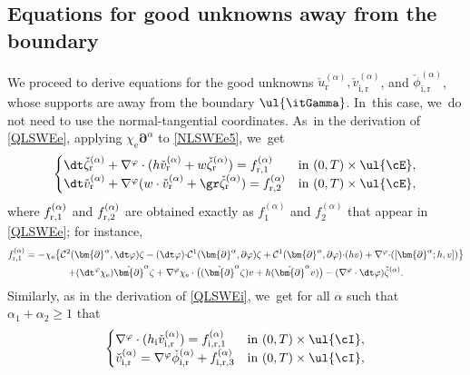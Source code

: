 \subsection{Equations for good unknowns away from the boundary}\label{subsect:EqGUb}
We proceed to derive equations for the good unknowns $\check{u}_\mathrm{r}^{(\alpha)},\check{v}_\mathrm{i,r}^{(\alpha)}$, and $\check{\phi}_\mathrm{i,r}^{(\alpha)}$,
whose supports are away from the boundary $\ul{\itGamma}$. In~this case, we~do not need to use the normal-tangential coordinates. As~in the derivation of \eqref{QLSWEe}, applying $\chi_\mathrm{e}\bm{\partial}^\alpha$ to \eqref{NLSWEe5}, we~get
\begin{equation}\label{QLSWEr}
\begin{cases}
\dt\check{\zeta}_\mathrm{r}^{(\alpha)}+\nabla^\varphi\cdot(h\check{v}_\mathrm{r}^{(\alpha)}+w\check{\zeta}_\mathrm{r}^{(\alpha)}) = f_{{\rm r},1}^{(\alpha)}
&\text{in } (0,T)\times\ul{\cE}, \\
\dt\check{v}_\mathrm{r}^{(\alpha)}+\nabla^\varphi(w\cdot\check{v}_\mathrm{r}^{(\alpha)}+\gr\check{\zeta}_\mathrm{r}^{(\alpha)}) = f_{{\rm r},2}^{(\alpha)}
&\text{in } (0,T)\times\ul{\cE},
\end{cases}
\end{equation}
where $f_{{\rm r},1}^{(\alpha)}$ and $f_{{\rm r},2}^{(\alpha)}$ are obtained exactly as $f_{1}^{(\alpha)}$ and $f_{2}^{(\alpha)}$ that appear in \eqref{QLSWEe};
for instance,
\begin{multline*}
f_{{\rm r},1}^{(\alpha)}
= -\chi_\mathrm{e} \big\{ {\mathcal C}^2(\bm{\partial}^\alpha,\dt\varphi)\zeta
- (\dt\varphi){\cdot} {\mathcal C}^1(\bm{\partial}^\alpha,\partial\varphi)\zeta
+{\mathcal C}^1(\bm{\partial}^\alpha,\partial\varphi){\cdot} (hv)+ \nabla^\varphi{\cdot}([\bm{\partial}^\alpha;h,v]) \big\} \\
+ (\dt^\varphi\chi_\mathrm{e}) \check{\bm{\partial}}^\alpha\zeta
+ \nabla^\varphi\chi_\mathrm{e}\cdot\bigl((\check{\bm{\partial}}^\alpha \zeta)v + h (\check{\bm{\partial}}^\alpha v) \bigr)
- (\nabla^\varphi\cdot\dt\varphi)\check{\zeta}^{(\alpha)}.
\end{multline*}
Similarly, as in the derivation of \eqref{QLSWEi}, we~get for all $\alpha$ such that $\alpha_1+\alpha_2\geq 1$ that
\begin{equation}\label{QLSWEir}
\begin{cases}
\nabla^\varphi\cdot(h_\mathrm{i}\check{v}_\mathrm{i,r}^{(\alpha)}) = f_{{\rm i,r},1}^{(\alpha)} &\text{in } (0,T)\times\ul{\cI}, \\
\check{v}_\mathrm{i,r}^{(\alpha)} = \nabla^\varphi\check{\phi}_\mathrm{i,r}^{(\alpha)} + f_{{\rm i,r},3}^{(\alpha)} &\text{in } (0,T)\times\ul{\cI},
\end{cases}
\end{equation}
